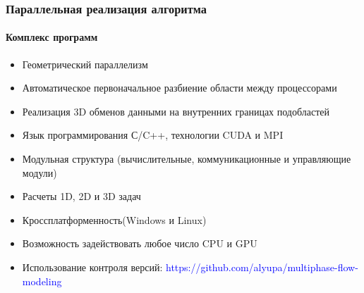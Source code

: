 \begin{frame}
\begin{center}
\frametitle{Параллельная реализация алгоритма}
\framesubtitle{Комплекс программ}
\begin{itemize}
\item Геометрический параллелизм
\item Автоматическое первоначальное разбиение области между процессорами
\item Реализация 3D обменов данными на внутренних границах подобластей
\item Язык программирования С/C++, технологии CUDA и MPI
\item Модульная структура (вычислительные, коммуникационные и управляющие модули)
\item Расчеты 1D, 2D и 3D задач
\item Кроссплатформенность(Windows и Linux)
\item Возможность задействовать любое число CPU и GPU
\item Использование контроля версий: \textcolor{blue}{https://github.com/alyupa/multiphase-flow-modeling}
\end{itemize}
\end{center}
\end{frame}